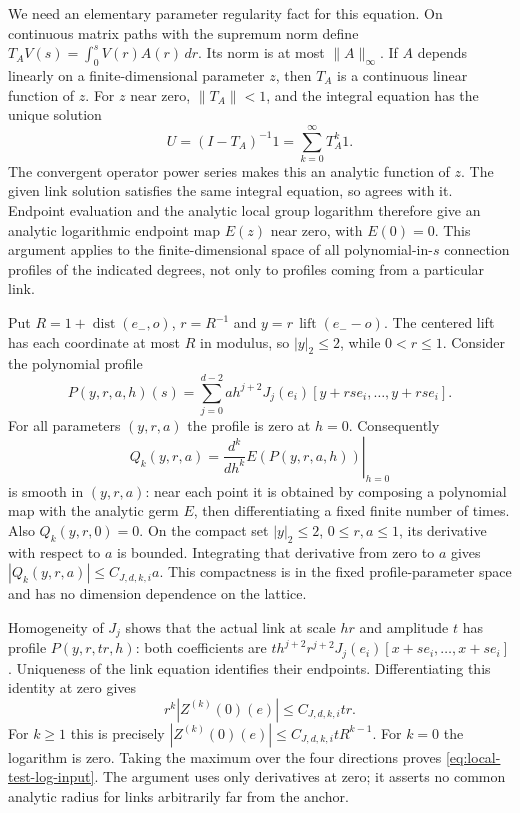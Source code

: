 We need an elementary parameter regularity fact for this equation.
On continuous matrix paths with the supremum norm define
$T_A V(s)=\int_0^s V(r)A(r)\,dr$. Its norm is at most
$\|A\|_\infty$. If $A$ depends linearly on a finite-dimensional
parameter $z$, then $T_A$ is a continuous linear function of $z$.
For $z$ near zero, $\|T_A\|<1$, and the integral equation has the
unique solution
\[
                         U=(I-T_A)^{-1}1
                           =\sum_{k=0}^\infty T_A^k1.
\]
The convergent operator power series makes this an analytic function
of $z$. The given link solution satisfies the same integral equation,
so agrees with it. Endpoint evaluation and the analytic local group
logarithm therefore give an analytic logarithmic endpoint map $E(z)$
near zero, with $E(0)=0$. This argument applies to the finite-dimensional
space of all polynomial-in-$s$ connection profiles of the indicated
degrees, not only to profiles coming from a particular link.

Put $R=1+\operatorname{dist}(e_-,o)$, $r=R^{-1}$ and
$y=r\,\operatorname{lift}(e_--o)$. The centered lift has each coordinate
at most $R$ in modulus, so $|y|_2\le2$, while $0<r\le1$.
Consider the polynomial profile
\[
       P(y,r,a,h)(s)=\sum_{j=0}^{d-2}a h^{j+2}
                    J_j(e_i)[y+rse_i,\ldots,y+rse_i].
\]
For all parameters $(y,r,a)$ the profile is zero at $h=0$.
Consequently
\[
       Q_k(y,r,a)=\left.\frac{d^k}{dh^k}
                                E(P(y,r,a,h))\right|_{h=0}
\]
is smooth in $(y,r,a)$: near each point it is obtained by
composing a polynomial map with the analytic germ $E$, then
differentiating a fixed finite number of times. Also $Q_k(y,r,0)=0$.
On the compact set $|y|_2\le2$, $0\le r,a\le1$, its derivative
with respect to $a$ is bounded. Integrating that derivative from
zero to $a$ gives $|Q_k(y,r,a)|\le C_{J,d,k,i}a$.
This compactness is in the fixed profile-parameter space and has
no dimension dependence on the lattice.

Homogeneity of $J_j$ shows that the actual link at scale $hr$ and
amplitude $t$ has profile $P(y,r,tr,h)$: both coefficients are
$t h^{j+2}r^{j+2}J_j(e_i)[x+se_i,\ldots,x+se_i]$.
Uniqueness of the link equation identifies their endpoints.
Differentiating this identity at zero gives
\[
       r^k|Z^{(k)}(0)(e)|\le C_{J,d,k,i}tr.
\]
For $k\ge1$ this is precisely
$|Z^{(k)}(0)(e)|\le C_{J,d,k,i}t R^{k-1}$.
For $k=0$ the logarithm is zero. Taking the maximum over the four
directions proves \eqref{eq:local-test-log-input}. The argument
uses only derivatives at zero; it asserts no common analytic radius
for links arbitrarily far from the anchor.

